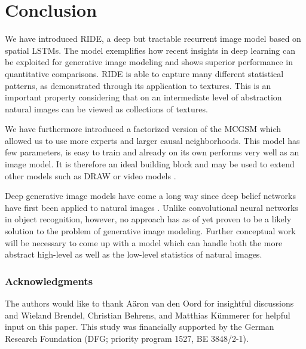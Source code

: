 \documentclass{article}
\begin{document}
	\section{Conclusion}
		We have introduced RIDE, a deep but tractable recurrent image model based on spatial LSTMs.
		The model exemplifies how recent insights in deep learning can be exploited for generative
		image modeling and shows superior performance in quantitative comparisons. RIDE is able to capture many
		different statistical patterns, as demonstrated through its application to textures. This is an
		important property considering that on an intermediate level of abstraction natural images
		can be viewed as collections of textures.

		We have furthermore introduced a factorized version of
		the MCGSM which allowed us to use more experts and larger causal neighborhoods. This
		model has few parameters, is easy to train and already on its own performs very
		well as an image model. It is therefore an ideal building block and may be used to extend other models such as DRAW
		\cite{Gregor:2015} or video models \cite{Ranzato:2014,Srivastava:2015}.

		Deep generative image models have come a long way since deep belief
		networks have first been applied to natural images \cite{Osindero:2008}. Unlike convolutional neural networks in object recognition,
		however, no approach has as of yet proven to be a likely solution to the problem of
		generative image modeling. Further conceptual work will be necessary to come up with a model
		which can handle both the more abstract high-level as well as the low-level statistics of natural images.

	\subsubsection*{Acknowledgments}
		The authors would like to thank Aäron van den Oord for insightful discussions and Wieland Brendel,
		Christian Behrens, and Matthias Kümmerer for helpful input on this paper. This study was
		financially supported by the German Research Foundation (DFG; priority program 1527, BE 3848/2-1).

	
	
\end{document}
